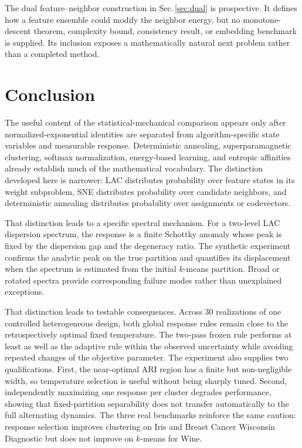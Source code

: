 \documentclass[11pt,a4paper]{article}
\theoremstyle{definition}
\theoremstyle{plain}
\begin{document}
The dual feature--neighbor construction in Sec.\,\ref{sec:dual} is prospective. It defines how a feature ensemble could modify the neighbor energy, but no monotone-descent theorem, complexity bound, consistency result, or embedding benchmark is supplied. Its inclusion exposes a mathematically natural next problem rather than a completed method.

\FloatBarrier

\section{Conclusion}
\label{sec:conclusion}

The useful content of the statistical-mechanical comparison appears only after normalized-exponential identities are separated from algorithm-specific state variables and measurable response. Deterministic annealing, superparamagnetic clustering, softmax normalization, energy-based learning, and entropic affinities already establish much of the mathematical vocabulary. The distinction developed here is narrower: LAC distributes probability over feature states in its weight subproblem, SNE distributes probability over candidate neighbors, and deterministic annealing distributes probability over assignments or codevectors.

That distinction leads to a specific spectral mechanism. For a two-level LAC dispersion spectrum, the response is a finite Schottky anomaly whose peak is fixed by the dispersion gap and the degeneracy ratio. The synthetic experiment confirms the analytic peak on the true partition and quantifies its displacement when the spectrum is estimated from the initial $k$-means partition. Broad or rotated spectra provide corresponding failure modes rather than unexplained exceptions.

That distinction leads to testable consequences. Across 30 realizations of one controlled heterogeneous design, both global response rules remain close to the retrospectively optimal fixed temperature. The two-pass frozen rule performs at least as well as the adaptive rule within the observed uncertainty while avoiding repeated changes of the objective parameter. The experiment also supplies two qualifications. First, the near-optimal ARI region has a finite but non-negligible width, so temperature selection is useful without being sharply tuned. Second, independently maximizing one response per cluster degrades performance, showing that fixed-partition separability does not transfer automatically to the full alternating dynamics. The three real benchmarks reinforce the same caution: response selection improves clustering on Iris and Breast Cancer Wisconsin Diagnostic but does not improve on $k$-means for Wine.
\end{document}
